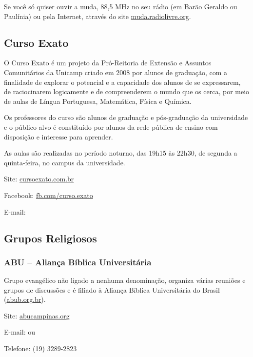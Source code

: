 Se você só quiser ouvir a muda, 88,5 MHz no seu rádio (em Barão Geraldo ou
Paulínia) ou pela Internet, através do site \url{muda.radiolivre.org}.

\subsection{Curso Exato}

O Curso Exato é um projeto da Pró-Reitoria de Extensão e Assuntos Comunitários
da Unicamp criado em 2008 por alunos de graduação, com a finalidade de explorar
o potencial e a capacidade dos alunos de se expressarem, de raciocinarem
logicamente e de compreenderem o mundo que os cerca, por meio de aulas de Língua
Portuguesa, Matemática, Física e Química.

Os professores do curso são alunos de graduação e pós-graduação da universidade
e o público alvo é constituído por alunos da rede pública de ensino com
disposição e interesse para aprender.

As aulas são realizadas no período noturno, das 19h15 às 22h30, de segunda a
quinta-feira, no campus da universidade.

\begin{compactitemize}
    \item Site: \url{cursoexato.com.br}
    \item Facebook: \url{fb.com/curso.exato}
    \item E-mail: 
\end{compactitemize}

\subsection{Grupos Religiosos}

\subsubsection*{ABU -- Aliança Bíblica Universitária}

Grupo evangélico não ligado a nenhuma denominação, organiza várias reuniões e
grupos de discussões e é filiado à Aliança Bíblica Universitária do Brasil
(\url{abub.org.br}).

\begin{compactitemize}
    \item Site: \url{abucampinas.org}
    \item E-mail:  ou
    \item Telefone: (19) 3289-2823
\end{compactitemize}

